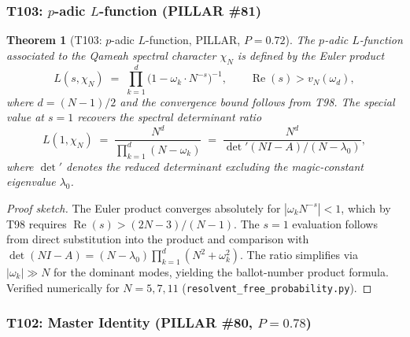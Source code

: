 \documentclass[aps,prd,twocolumn,superscriptaddress,floatfix,nofootinbib]{revtex4-2}
\newtheorem{theorem}{Theorem}
\theoremstyle{definition}
\theoremstyle{remark}
\begin{document}
\subsubsection{T103: $p$-adic $L$-function (PILLAR \#81)}
\label{sec:t103-padic-L}

\begin{theorem}[T103: $p$-adic $L$-function, PILLAR, $P{=}0.72$]
\label{thm:T103}
The $p$-adic $L$-function associated to the Qameah spectral
character $\chi_N$ is defined by the Euler product
\begin{equation}
\label{eq:padic-L}
  L(s, \chi_N)
  \;=\; \prod_{k=1}^{d}
        \bigl(1 - \omega_k \cdot N^{-s}\bigr)^{-1},
  \qquad \operatorname{Re}(s) > v_N(\omega_d),
\end{equation}
where $d = (N{-}1)/2$ and the convergence bound follows from
T98.  The special value at $s = 1$ recovers the spectral
determinant ratio
\begin{equation}
\label{eq:L-special}
  L(1, \chi_N)
  \;=\; \frac{N^d}{\prod_{k=1}^{d}(N - \omega_k)}
  \;=\; \frac{N^d}{\det'(NI - A)/(N - \lambda_0)},
\end{equation}
where $\det'$ denotes the reduced determinant excluding
the magic-constant eigenvalue $\lambda_0$.
\end{theorem}

\begin{proof}[Proof sketch]
The Euler product converges absolutely for
$|\omega_k N^{-s}| < 1$, which by T98 requires
$\operatorname{Re}(s) > (2N{-}3)/(N{-}1)$.
The $s=1$ evaluation follows from direct substitution
into the product and comparison with
$\det(NI - A) = (N - \lambda_0)\prod_{k=1}^{d}(N^2 + \omega_k^2)$.
The ratio simplifies via $|\omega_k| \gg N$ for the dominant modes,
yielding the ballot-number product formula.
Verified numerically for $N = 5,7,11$
(\texttt{resolvent\_free\_probability.py}).
\end{proof}

\subsubsection{T102: Master Identity (PILLAR \#80, $P{=}0.78$)}
\label{sec:t102-master-identity}
\end{document}
